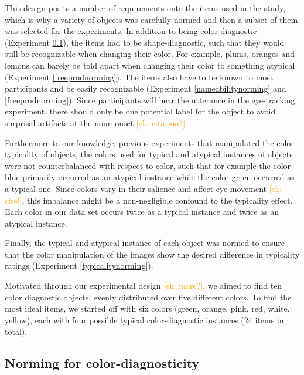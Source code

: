 \documentclass[a4paper,man,floatsintext,natbib,donotrepeattitle]{apa6}
\newcommand{\ek}[1]{\textcolor{Orange}{[ek: #1]}}
\begin{document}
This design posits a number of requirements onto the items used in the study, which is why a variety of objects was carefully normed and then a subset of them was selected for the experiments. In addition to being color-diagnostic (Experiment \ref{coldiagnorming}), the items had to be shape-diagnostic, such that they would still be recognizable when changing their color. For example, plums, oranges and lemons can barely be told apart when changing their color to something atypical (Experiment \ref{freeprodnorming}). The items also have to be known to most participants and be easily recognizable (Experiment \ref{nameabilitynorming} and \ref{freeprodnorming}). Since participants will hear the utterance in the eye-tracking experiment, there should only be one potential label for the object to avoid surprisal artifacts at the noun onset \ek{citation?}.

Furthermore to our knowledge, previous experiments that manipulated the color typicality of objects, the colors used for typical and atypical instances of objects were not counterbalanced with respect to color, such that for example the color blue primarily occurred as an atypical instance while the color green occurred as a typical one. Since colors vary in their salience and affect eye movement \ek{cite!}, this imbalance might be a non-negligible confound to the typicality effect. Each color in our data set occurs twice as a typical instance and twice as an atypical instance.

Finally, the typical and atypical instance of each object was normed to ensure that the color manipulation of the images show the desired difference in typicality ratings (Experiment \ref{typicalitynorming}).

Motivated through our experimental design \ek{more?}, we aimed to find ten color diagnostic objects, evenly distributed over five different colors. To find the most ideal items, we started off with six colors (green, orange, pink, red, white, yellow), each with four possible typical color-diagnostic instances (24 items in total).

\subsection{Norming for color-diagnosticity}
\label{coldiagnorming}

\end{document}
